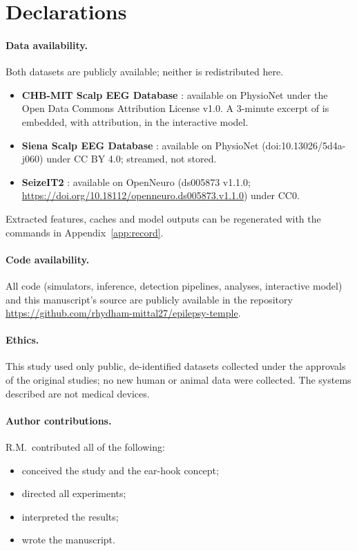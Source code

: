 \section*{Declarations}

\paragraph{Data availability.} Both datasets are publicly available; neither is redistributed here.
\begin{itemize}
\item \textbf{CHB-MIT Scalp EEG Database} \cite{shoeb2009,goldberger2000}: available on PhysioNet under the Open Data Commons Attribution License v1.0. A 3-minute excerpt of  is embedded, with attribution, in the interactive model.
\item \textbf{Siena Scalp EEG Database} \cite{detti2020,goldberger2000}: available on PhysioNet (doi:10.13026/5d4a-j060) under CC BY 4.0; streamed, not stored.
\item \textbf{SeizeIT2} \cite{bhagubai2025}: available on OpenNeuro (ds005873 v1.1.0; \url{https://doi.org/10.18112/openneuro.ds005873.v1.1.0}) under CC0.
\end{itemize}
Extracted features, caches and model outputs can be regenerated with the commands in Appendix~\ref{app:record}.

\paragraph{Code availability.} All code (simulators, inference, detection pipelines, analyses, interactive model) and this manuscript's source are publicly available in the repository \url{https://github.com/rhydham-mittal27/epilepsy-temple}.

\paragraph{Ethics.} This study used only public, de-identified datasets collected under the approvals of the original studies; no new human or animal data were collected. The systems described are not medical devices.

\paragraph{Author contributions.} R.M.\ contributed all of the following:
\begin{itemize}
\item conceived the study and the ear-hook concept;
\item directed all experiments;
\item interpreted the results;
\item wrote the manuscript.
\end{itemize}

